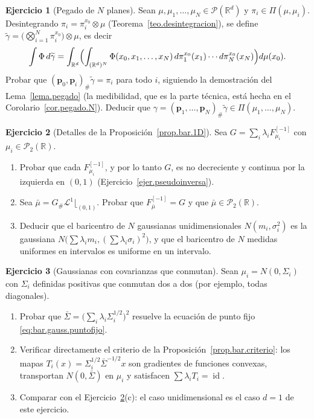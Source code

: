 \documentclass[12pt, a4paper]{amsbook}
\newcommand{\id}{\operatorname{id}}
\newcommand{\R}{{\mathbb R}}
\newcommand{\LL}{{\mathcal L}}
\newcommand{\pp}{{\mathbf p}}
\theoremstyle{remark}
\theoremstyle{definition}
\newtheorem{ejercicio}{Ejercicio}[chapter]
\numberwithin{section}{chapter}
\numberwithin{subsection}{section}
\numberwithin{equation}{section}
\numberwithin{figure}{chapter}
\begin{document}
\begin{ejercicio}[Pegado de $N$ planes]\label{ejer.pegado.N}
Sean $\mu,\mu_1,\dots,\mu_N\in\mathcal P(\R^d)$ y $\pi_i\in\Pi(\mu,\mu_i)$.
Desintegrando $\pi_i=\pi_i^{x_0}\otimes\mu$
(Teorema~\ref{teo.desintegracion}), se define
$\widetilde\gamma=\bigl(\bigotimes_{i=1}^N\pi_i^{x_0}\bigr)\otimes\mu$,
es decir
\[
\int\Phi\,d\widetilde\gamma
=\int_{\R^d}\Bigl(\int_{(\R^d)^N}\Phi(x_0,x_1,\dots,x_N)\,d\pi_1^{x_0}(x_1)\cdots d\pi_N^{x_0}(x_N)\Bigr)d\mu(x_0).
\]
Probar que $(\pp_0,\pp_i)_\#\widetilde\gamma=\pi_i$
para todo $i$, siguiendo la demostración del Lema~\ref{lema.pegado} (la
medibilidad, que es la parte técnica, está hecha en el
Corolario~\ref{cor.pegado.N}). Deducir
que $\gamma=(\pp_1,\dots,\pp_N)_\#\widetilde\gamma\in\Pi(\mu_1,\dots,\mu_N)$.
\end{ejercicio}

\begin{ejercicio}[Detalles de la Proposición~\ref{prop.bar.1D}]\label{ejer.bar.pseudoinversa}
Sea $G=\sum_i\lambda_iF_{\mu_i}^{[-1]}$ con $\mu_i\in\mathcal P_2(\R)$.
\begin{enumerate}[label=(\alph*)]
\item Probar que cada $F_{\mu_i}^{[-1]}$, y por lo tanto $G$, es no
decreciente y continua por la izquierda en $(0,1)$
(Ejercicio~\ref{ejer.pseudoinversa}).
\item Sea $\bar\mu=G_\#\LL^1\lfloor_{(0,1)}$. Probar que
$F_{\bar\mu}^{[-1]}=G$ y que $\bar\mu\in\mathcal P_2(\R)$.
\item Deducir que el baricentro de $N$ gaussianas unidimensionales
$N(m_i,\sigma_i^2)$ es la gaussiana $N\bigl(\sum\lambda_im_i,(\sum\lambda_i\sigma_i)^2\bigr)$,
y que el baricentro de $N$ medidas uniformes en intervalos es uniforme en
un intervalo.
\end{enumerate}
\end{ejercicio}

\begin{ejercicio}[Gaussianas con covarianzas que conmutan]\label{ejer.bar.gauss.conmutan}
Sean $\mu_i=N(0,\Sigma_i)$ con $\Sigma_i$ definidas positivas que conmutan
dos a dos (por ejemplo, todas diagonales).
\begin{enumerate}[label=(\alph*)]
\item Probar que $\bar\Sigma=\bigl(\sum_i\lambda_i\Sigma_i^{1/2}\bigr)^2$
resuelve la ecuación de punto fijo \eqref{eq:bar.gauss.puntofijo}.
\item Verificar directamente el criterio de la
Proposición~\ref{prop.bar.criterio}: los mapas $T_i(x)=\Sigma_i^{1/2}\bar\Sigma^{-1/2}x$
son gradientes de funciones convexas, transportan $N(0,\bar\Sigma)$ en
$\mu_i$ y satisfacen $\sum\lambda_iT_i=\id$.
\item Comparar con el Ejercicio~\ref{ejer.bar.pseudoinversa}(c): el caso
unidimensional es el caso $d=1$ de este ejercicio.
\end{enumerate}
\end{ejercicio}
\end{document}
